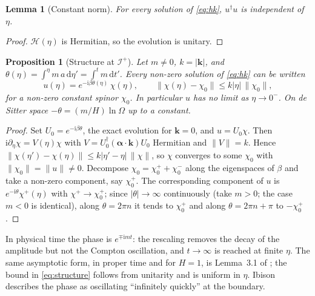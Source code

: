 \documentclass[11pt,a4paper]{article}
\newtheorem{proposition}{Proposition}
\newtheorem{lemma}{Lemma}
\theoremstyle{definition}
\newcommand{\scri}{\mathscr{I}^{+}}
\newcommand{\dd}{\mathrm{d}}
\newcommand{\ii}{\mathrm{i}}
\begin{document}
\begin{lemma}[Constant norm]
\label{lem:norm}
For every solution of \eqref{eq:hk}, $u^{\dagger}u$ is independent of $\eta$.
\end{lemma}
\begin{proof}
$\mathcal{H}(\eta)$ is Hermitian, so the evolution is unitary.
\end{proof}

\begin{proposition}[Structure at $\scri$]
\label{prop:dirac}
Let $m\neq0$, $k=|\mathbf{k}|$, and $\theta(\eta)=\int^{\eta}m\,a\,\dd\eta'=\int^{t}m\,\dd t'$. Every non-zero solution of \eqref{eq:hk} can be written
\begin{equation}
u(\eta)=e^{-\ii\beta\theta(\eta)}\,\chi(\eta),\qquad \|\chi(\eta)-\chi_{0}\|\le k|\eta|\,\|\chi_{0}\|,
\label{eq:structure}
\end{equation}
for a non-zero constant spinor $\chi_{0}$. In particular $u$ has no limit as $\eta\to0^{-}$. On de Sitter space $-\theta=(m/H)\ln\Omega$ up to a constant.
\end{proposition}
\begin{proof}
Set $U_{0}=e^{-\ii\beta\theta}$, the exact evolution for $\mathbf{k}=0$, and $u=U_{0}\chi$. Then $\ii\partial_{\eta}\chi=V(\eta)\chi$ with $V=U_{0}^{\dagger}(\boldsymbol\alpha\cdot\mathbf{k})U_{0}$ Hermitian and $\|V\|=k$. Hence $\|\chi(\eta')-\chi(\eta)\|\le k|\eta'-\eta|\,\|\chi\|$, so $\chi$ converges to some $\chi_{0}$ with $\|\chi_{0}\|=\|u\|\neq0$. Decompose $\chi_{0}=\chi_{0}^{+}+\chi_{0}^{-}$ along the eigenspaces of $\beta$ and take a non-zero component, say $\chi_{0}^{+}$. The corresponding component of $u$ is $e^{-\ii\theta}\chi^{+}(\eta)$ with $\chi^{+}\to\chi_{0}^{+}$; since $|\theta|\to\infty$ continuously (take $m>0$; the case $m<0$ is identical), along $\theta=2\pi n$ it tends to $\chi_{0}^{+}$ and along $\theta=2\pi n+\pi$ to $-\chi_{0}^{+}$.
\end{proof}

In physical time the phase is $e^{\mp\ii mt}$: the rescaling removes the decay of the amplitude but not the Compton oscillation, and $t\to\infty$ is reached at finite $\eta$. The same asymptotic form, in proper time and for $H=1$, is Lemma~3.1 of \cite{DFMR2019}; the bound in \eqref{eq:structure} follows from unitarity and is uniform in $\eta$. Ibison \cite{Ibison2011} describes the phase as oscillating ``infinitely quickly'' at the boundary.
\end{document}
